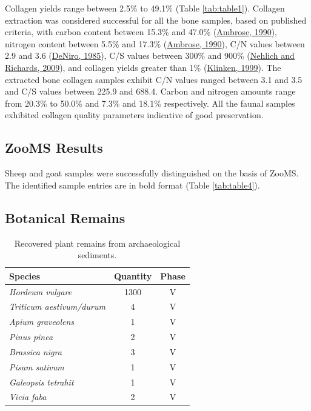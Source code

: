 \documentclass[3p]{elsarticle} %
\begin{document}
Collagen yields range between 2.5\% to 49.1\% (Table \ref{tab:table1}). Collagen extraction was considered successful for all the bone samples, based on published criteria, with carbon content between 15.3\% and 47.0\% (\protect\hyperlink{ref-ambrose90}{Ambrose, 1990}), nitrogen content between 5.5\% and 17.3\% (\protect\hyperlink{ref-ambrose90}{Ambrose, 1990}), C/N values between 2.9 and 3.6 (\protect\hyperlink{ref-deniro85}{DeNiro, 1985}), C/S values between 300\% and 900\% (\protect\hyperlink{ref-nehlich_richards09}{Nehlich and Richards, 2009}), and collagen yields greater than 1\% (\protect\hyperlink{ref-vanklinken99}{Klinken, 1999}). The extracted bone collagen samples exhibit C/N values ranged between 3.1 and 3.5 and C/S values between 225.9 and 688.4. Carbon and nitrogen amounts range from 20.3\% to 50.0\% and 7.3\% and 18.1\% respectively. All the faunal samples exhibited collagen quality parameters indicative of good preservation.

\hypertarget{zooms-results}{%
\subsection{ZooMS Results}\label{zooms-results}}

Sheep and goat samples were successfully distinguished on the basis of ZooMS. The identified sample entries are in bold format (Table \ref{tab:table4}).

\hypertarget{botanical-remains}{%
\subsection{Botanical Remains}\label{botanical-remains}}

\begin{table}[!h]

\caption{\label{tab:table2}Recovered plant remains from archaeological sediments.}
\centering
\fontsize{7.5}{9.5}\selectfont
\begin{tabular}[t]{>{}lcc}
\toprule
Species & Quantity & Phase\\
\midrule
\em{Hordeum vulgare} & 1300 & V\\
\em{Triticum aestivum/durum} & 4 & V\\
\em{Apium graveolens} & 1 & V\\
\em{Pinus pinea} & 2 & V\\
\em{Brassica nigra} & 3 & V\\
\em{Pisum sativum} & 1 & V\\
\em{Galeopsis tetrahit} & 1 & V\\
\em{Vicia faba} & 2 & V\\
\bottomrule
\end{tabular}
\end{table}
\end{document}
